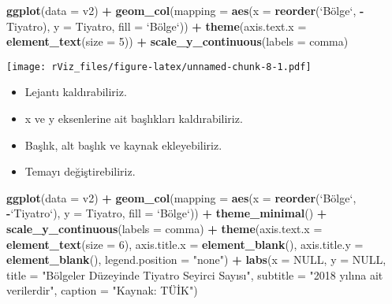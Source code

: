\documentclass[
]{book}
\newenvironment{Shaded}{\begin{snugshade}}{\end{snugshade}}
\newcommand{\DataTypeTok}[1]{\textcolor[rgb]{0.13,0.29,0.53}{#1}}
\newcommand{\DecValTok}[1]{\textcolor[rgb]{0.00,0.00,0.81}{#1}}
\newcommand{\KeywordTok}[1]{\textcolor[rgb]{0.13,0.29,0.53}{\textbf{#1}}}
\newcommand{\NormalTok}[1]{#1}
\newcommand{\OperatorTok}[1]{\textcolor[rgb]{0.81,0.36,0.00}{\textbf{#1}}}
\newcommand{\OtherTok}[1]{\textcolor[rgb]{0.56,0.35,0.01}{#1}}
\newcommand{\StringTok}[1]{\textcolor[rgb]{0.31,0.60,0.02}{#1}}
\begin{document}
\begin{Shaded}
\begin{Highlighting}[]
\KeywordTok{ggplot}\NormalTok{(}\DataTypeTok{data =}\NormalTok{ v2) }\OperatorTok{+}
\StringTok{  }\KeywordTok{geom_col}\NormalTok{(}\DataTypeTok{mapping =} \KeywordTok{aes}\NormalTok{(}\DataTypeTok{x =} \KeywordTok{reorder}\NormalTok{(}\StringTok{`}\DataTypeTok{Bölge}\StringTok{`}\NormalTok{, }\OperatorTok{-}\NormalTok{Tiyatro), }\DataTypeTok{y =}\NormalTok{ Tiyatro, }\DataTypeTok{fill =} \StringTok{`}\DataTypeTok{Bölge}\StringTok{`}\NormalTok{)) }\OperatorTok{+}
\StringTok{  }\KeywordTok{theme}\NormalTok{(}\DataTypeTok{axis.text.x =} \KeywordTok{element_text}\NormalTok{(}\DataTypeTok{size =} \DecValTok{5}\NormalTok{)) }\OperatorTok{+}
\StringTok{  }\KeywordTok{scale_y_continuous}\NormalTok{(}\DataTypeTok{labels =}\NormalTok{ comma)}
\end{Highlighting}
\end{Shaded}

\texttt{[image: rViz\_files/figure-latex/unnamed-chunk-8-1.pdf]}

\begin{itemize}
\item
  Lejantı kaldırabiliriz.
\item
  x ve y eksenlerine ait başlıkları kaldırabiliriz.
\item
  Başlık, alt başlık ve kaynak ekleyebiliriz.
\item
  Temayı değiştirebiliriz.
\end{itemize}

\begin{Shaded}
\begin{Highlighting}[]
\KeywordTok{ggplot}\NormalTok{(}\DataTypeTok{data =}\NormalTok{ v2) }\OperatorTok{+}
\StringTok{  }\KeywordTok{geom_col}\NormalTok{(}\DataTypeTok{mapping =} \KeywordTok{aes}\NormalTok{(}\DataTypeTok{x =} \KeywordTok{reorder}\NormalTok{(}\StringTok{`}\DataTypeTok{Bölge}\StringTok{`}\NormalTok{, }\OperatorTok{-}\StringTok{`}\DataTypeTok{Tiyatro}\StringTok{`}\NormalTok{), }\DataTypeTok{y =}\NormalTok{ Tiyatro, }\DataTypeTok{fill =} \StringTok{`}\DataTypeTok{Bölge}\StringTok{`}\NormalTok{)) }\OperatorTok{+}
\StringTok{  }\KeywordTok{theme_minimal}\NormalTok{() }\OperatorTok{+}
\StringTok{  }\KeywordTok{scale_y_continuous}\NormalTok{(}\DataTypeTok{labels =}\NormalTok{ comma) }\OperatorTok{+}
\StringTok{  }\KeywordTok{theme}\NormalTok{(}\DataTypeTok{axis.text.x =} \KeywordTok{element_text}\NormalTok{(}\DataTypeTok{size =} \DecValTok{6}\NormalTok{),}
        \DataTypeTok{axis.title.x =} \KeywordTok{element_blank}\NormalTok{(),}
        \DataTypeTok{axis.title.y =} \KeywordTok{element_blank}\NormalTok{(),}
        \DataTypeTok{legend.position =} \StringTok{"none"}\NormalTok{) }\OperatorTok{+}
\StringTok{  }\KeywordTok{labs}\NormalTok{(}\DataTypeTok{x =} \OtherTok{NULL}\NormalTok{,}
       \DataTypeTok{y =} \OtherTok{NULL}\NormalTok{,}
       \DataTypeTok{title =} \StringTok{"Bölgeler Düzeyinde Tiyatro Seyirci Sayısı"}\NormalTok{,}
       \DataTypeTok{subtitle =} \StringTok{"2018 yılına ait verilerdir"}\NormalTok{,}
       \DataTypeTok{caption =} \StringTok{"Kaynak: TÜİK"}\NormalTok{)}
\end{Highlighting}
\end{Shaded}
\end{document}
